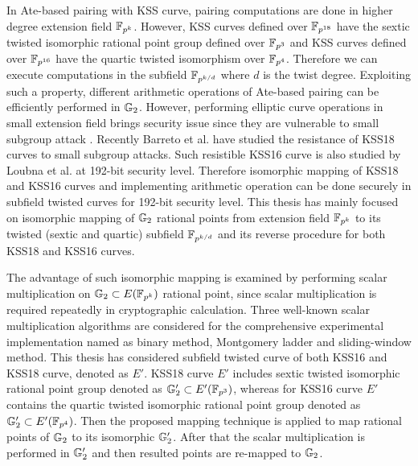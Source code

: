 In Ate-based pairing with KSS curve,  pairing computations are done in higher degree extension field $\mathbb{F}_{p^k}$.
However, KSS curves defined over $\mathbb{F}_{p^{18}}$ have the sextic twisted isomorphic rational point group defined over $\mathbb{F}_{p^3}$ and KSS curves defined over $\mathbb{F}_{p^{16}}$ have the quartic twisted  isomorphism over $\mathbb{F}_{p^4}$. 
Therefore we can execute computations in the subfield $\mathbb{F}_{p^{k/d}}$ where $d$ is the twist degree. 
Exploiting such a property, different arithmetic operations of Ate-based pairing can be efficiently performed in ${\mathbb{G}}_{2}$.  
However, performing elliptic curve operations in small extension field brings security issue since they are vulnerable to small subgroup attack \cite{C:LimLee97}. 
Recently Barreto et al. \cite{LC:BCMNPZ15} have studied the resistance of  KSS18 curves to small subgroup attacks. 
Such resistible KSS16 curve is also studied by Loubna et al. \cite{EPRINT:GhaFou16b} at 192-bit security level. 
Therefore isomorphic mapping of KSS18 and KSS16 curves and implementing arithmetic operation can be done securely in subfield twisted curves for 192-bit security level.
This thesis has mainly focused on isomorphic mapping of ${\mathbb{G}}_{2}$ rational points from extension field $\mathbb{F}_{p^k}$ to its twisted (sextic and quartic) subfield $\mathbb{F}_{p^{k/d}}$ and its reverse procedure for both KSS18 and KSS16 curves. 

The advantage of such isomorphic mapping is examined by performing scalar multiplication on ${\mathbb{G}}_{2} \subset E(\mathbb{F}_{p^k})$ rational point, since scalar multiplication is required repeatedly in cryptographic calculation. 
Three well-known scalar multiplication algorithms are considered for the comprehensive experimental implementation named as binary method, Montgomery ladder and sliding-window method.
This thesis has considered subfield  twisted curve of both  KSS16 and KSS18 curve, denoted as $E'$. 
KSS18 curve $E'$ includes sextic twisted isomorphic rational point group denoted as ${\mathbb{G}}_{2}' \subset E'(\mathbb{F}_{p^3})$, whereas  for KSS16 curve $E'$ contains the quartic twisted  isomorphic rational point group denoted as ${\mathbb{G}}_{2}' \subset E'(\mathbb{F}_{p^4})$.
Then the proposed mapping technique is applied to map rational points of ${\mathbb{G}}_{2}$ to its isomorphic ${\mathbb{G}}_{2}'$. 
After that the scalar multiplication  is performed  in ${\mathbb{G}}_{2}'$ and then resulted points are re-mapped to ${\mathbb{G}}_{2}$.

